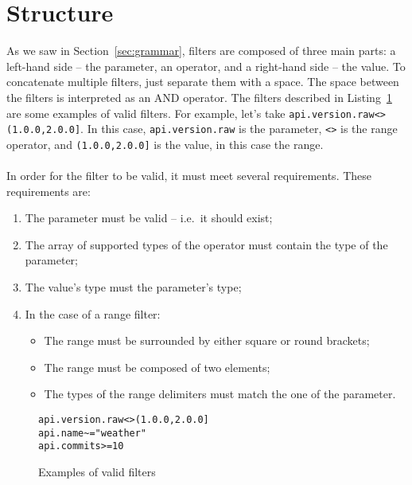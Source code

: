 \section{Structure}\label{sec:structure}
As we saw in Section~\ref{sec:grammar}, filters are composed of three main parts: a left-hand side -- the parameter, an operator, and a right-hand side -- the value.
To concatenate multiple filters, just separate them with a space.
The space between the filters is interpreted as an AND operator.
The filters described in Listing~\ref{fig:example-filters} are some examples of valid filters.
For example, let's take \verb|api.version.raw<>(1.0.0,2.0.0]|.
In this case, \verb|api.version.raw| is the parameter, \verb|<>| is the range operator, and \verb|(1.0.0,2.0.0]| is the value, in this case the range. \\ \\
In order for the filter to be valid, it must meet several requirements.
These requirements are:

\begin{enumerate}
    \item The parameter must be valid -- i.e.\ it should exist;
    \item The array of supported types of the operator must contain the type of the parameter;
    \item The value's type must the parameter's type;
    \item In the case of a range filter:
    \begin{itemize}
        \item The range must be surrounded by either square or round brackets;
        \item The range must be composed of two elements;
        \item The types of the range delimiters must match the one of the parameter.
    \end{itemize}
\end{enumerate}

\begin{figure}[!h]
    \begin{center}
        \verb|api.version.raw<>(1.0.0,2.0.0]| \\
        \verb|api.name~="weather"| \\
        \verb|api.commits>=10|
    \end{center}

    \caption{Examples of valid filters}
    \label{fig:example-filters}
\end{figure}
